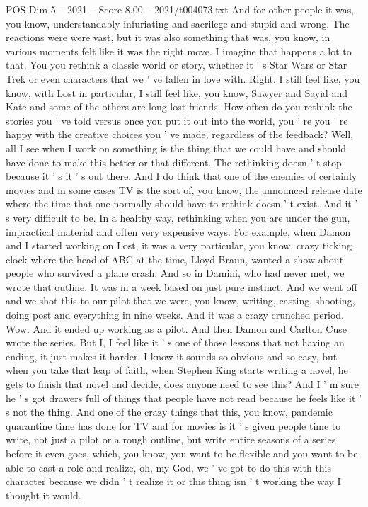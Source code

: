 \begin{textsample}{POS Dim 5 – 2021 – Score 8.00 – 2021/t004073.txt}
And for other people it was, you know, understandably infuriating and sacrilege and stupid and wrong.
The reactions were were vast, but it was also something that was, you know, in various moments felt like it was the right move.
I imagine that happens a lot to that.
You you rethink a classic world or story, whether it ' s Star Wars or Star Trek or even characters that we ' ve fallen in love with.
Right.
I still feel like, you know, with Lost in particular, I still feel like, you know, Sawyer and Sayid and Kate and some of the others are long lost friends.
How often do you rethink the stories you ' ve told versus once you put it out into the world, you ' re you ' re happy with the creative choices you ' ve made, regardless of the feedback?
Well, all I see when I work on something is the thing that we could have and should have done to make this better or that different.
The rethinking doesn ' t stop because it ' s it ' s out there.
And I do think that one of the enemies of certainly movies and in some cases TV is the sort of, you know, the announced release date where the time that one normally should have to rethink doesn ' t exist.
And it ' s very difficult to be.
In a healthy way, rethinking when you are under the gun, impractical material and often very expensive ways.
For example, when Damon and I started working on Lost, it was a very particular, you know, crazy ticking clock where the head of ABC at the time, Lloyd Braun, wanted a show about people who survived a plane crash.
And so in Damini, who had never met, we wrote that outline.
It was in a week based on just pure instinct.
And we went off and we shot this to our pilot that we were, you know, writing, casting, shooting, doing post and everything in nine weeks.
And it was a crazy crunched period.
Wow.
And it ended up working as a pilot.
And then Damon and Carlton Cuse wrote the series.
But I, I feel like it ' s one of those lessons that not having an ending, it just makes it harder.
I know it sounds so obvious and so easy, but when you take that leap of faith, when Stephen King starts writing a novel, he gets to finish that novel and decide, does anyone need to see this?
And I ' m sure he ' s got drawers full of things that people have not read because he feels like it ' s not the thing.
And one of the crazy things that this, you know, pandemic quarantine time has done for TV and for movies is it ' s given people time to write, not just a pilot or a rough outline, but write entire seasons of a series before it even goes, which, you know, you want to be flexible and you want to be able to cast a role and realize, oh, my God, we ' ve got to do this with this character because we didn ' t realize it or this thing isn ' t working the way I thought it would.

\end{textsample}
